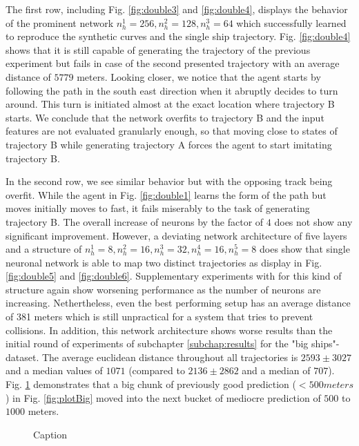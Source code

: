 The first row, including Fig. \ref{fig:double3} and \ref{fig:double4}, displays the behavior of the prominent network $n_h^1=256, n_h^2=128, n_h^3=64$ which successfully learned to reproduce the synthetic curves and the single ship trajectory. Fig. \ref{fig:double4} shows that it is still capable of generating the trajectory of the previous experiment but fails in case of the second presented trajectory with an average distance of $5779$ meters. Looking closer, we notice that the agent starts by following the path in the south east direction when it abruptly decides to turn around. This turn is initiated almost at the exact location where trajectory B starts. We conclude that the network overfits to trajectory B and the input features are not evaluated granularly enough, so that moving close to states of trajectory B while generating trajectory A forces the agent to start imitating trajectory B.
\par
In the second row, we see similar behavior but with the opposing track being overfit. While the agent in Fig. \ref{fig:double1} learns the form of the path but moves initially moves to fast, it fails miserably to the task of generating trajectory B. The overall increase of neurons by the factor of $4$ does not show any significant improvement. However, a deviating network architecture of five layers and a structure of $n_h^1=8, n_h^2=16, n_h^3=32, n_h^4=16, n_h^5=8$ does show that single neuronal network is able to map two distinct trajectories as display in Fig. \ref{fig:double5} and \ref{fig:double6}. Supplementary experiments with for this kind of structure again show worsening performance as the number of neurons are increasing. Nethertheless, even the best performing setup has an average distance of 381 meters which is still unpractical for a system that tries to prevent collisions. In addition, this network architecture shows worse results than the initial round of experiments of subchapter \ref{subchap:results} for the "big ships"-dataset. The average euclidean distance throughout all trajectories is $2593 \pm 3027$ and a median values of $1071$ (compared to $2136 \pm 2862$ and a median of $707$). Fig. \ref{fig:finalBarPlot} demonstrates that a big chunk of previously good prediction ($<500 meters$) in Fig. \ref{fig:plotBig} moved into the next bucket of mediocre prediction of $500$ to $1000$ meters. 
\begin{figure}[H]
    \centering
    
    \caption{Caption}
    \label{fig:finalBarPlot}
\end{figure}

